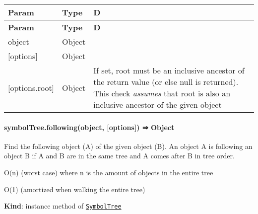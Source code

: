\tabulinesep=1mm
\begin{longtabu} spread 0pt [c]{*{3}{|X[-1]}|}
\hline
\rowcolor{\tableheadbgcolor}\textbf{ Param  }&\textbf{ Type  }&\textbf{ D   }\\
\endfirsthead
\hline
\endfoot
\hline
\rowcolor{\tableheadbgcolor}\textbf{ Param  }&\textbf{ Type  }&\textbf{ D   }\\
\endhead
object  &{\ttfamily Object}  &\\
\mbox{[}options\mbox{]}  &{\ttfamily Object}  &\\
\mbox{[}options.\+root\mbox{]}  &{\ttfamily Object}  &If set, {\ttfamily root} must be an inclusive ancestor of the return value (or else null is returned). This check {\itshape assumes} that {\ttfamily root} is also an inclusive ancestor of the given {\ttfamily object}   \\
\end{longtabu}


\label{_module_symbol-tree--SymbolTree+following}%


\paragraph*{symbol\+Tree.\+following(object, \mbox{[}options\mbox{]}) ⇒ {\ttfamily Object}}

Find the following object (A) of the given object (B). An object A is following an object B if A and B are in the same tree and A comes after B in tree order.


\begin{DoxyItemize}
\item {\ttfamily O(n)} (worst case) where {\ttfamily n} is the amount of objects in the entire tree
\item {\ttfamily O(1)} (amortized when walking the entire tree)
\end{DoxyItemize}

{\bfseries Kind}\+: instance method of {\ttfamily \href{#exp_module_symbol-tree--SymbolTree}{\tt Symbol\+Tree}}

